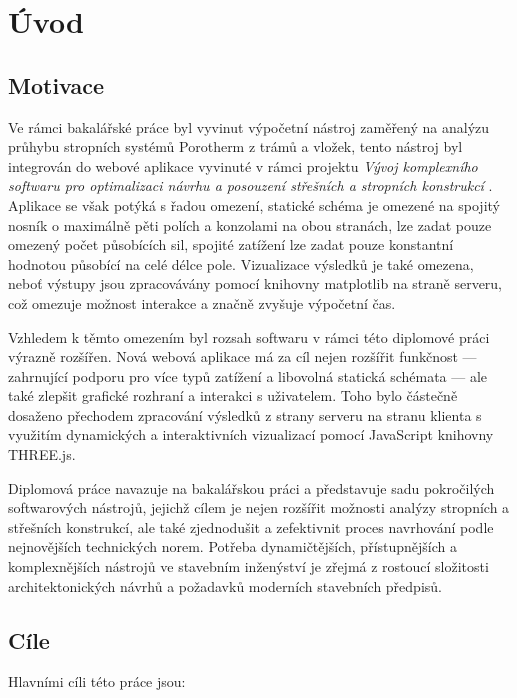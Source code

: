 \chapter*{Úvod}

\section*{Motivace}

Ve rámci bakalářské práce \cite{mythesis} byl vyvinut výpočetní nástroj zaměřený na analýzu průhybu stropních systémů Porotherm z trámů a vložek,
tento nástroj byl integrován do webové aplikace vyvinuté v rámci projektu \textit{Vývoj komplexního softwaru pro optimalizaci návrhu a posouzení střešních a stropních konstrukcí} \cite{wbapp}. Aplikace se však potýká s řadou omezení, statické schéma je omezené na spojitý nosník o maximálně pěti polích a konzolami na obou stranách, lze zadat pouze omezený počet působících sil, spojité zatížení lze zadat pouze konstantní hodnotou působící na celé délce pole. Vizualizace výsledků je také omezena, neboť výstupy jsou zpracovávány pomocí knihovny matplotlib \cite{matplotlib} na straně serveru, což omezuje možnost interakce a značně zvyšuje výpočetní čas.

Vzhledem k těmto omezením byl rozsah softwaru v rámci této diplomové práci výrazně rozšířen. Nová webová aplikace má za cíl nejen rozšířit funkčnost — zahrnující podporu pro více typů zatížení a libovolná statická schémata — ale také zlepšit grafické rozhraní a interakci s uživatelem. Toho bylo částečně dosaženo přechodem zpracování výsledků z strany serveru na stranu klienta s využitím dynamických a interaktivních vizualizací pomocí JavaScript knihovny THREE.js.

Diplomová práce navazuje na bakalářskou práci a představuje sadu pokročilých softwarových nástrojů, jejichž cílem je nejen rozšířit možnosti analýzy stropních a střešních konstrukcí, ale také zjednodušit a zefektivnit proces navrhování podle nejnovějších technických norem. Potřeba dynamičtějších, přístupnějších a komplexnějších nástrojů ve stavebním inženýství je zřejmá z rostoucí složitosti architektonických návrhů a požadavků moderních stavebních předpisů.


\section*{Cíle}

Hlavními cíli této práce jsou:

